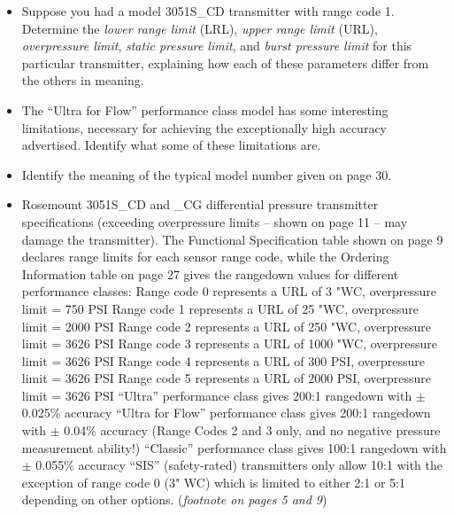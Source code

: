 \begin{itemize}
\item{} Suppose you had a model 3051S\_CD transmitter with range code 1.  Determine the {\it lower range limit} (LRL), {\it upper range limit} (URL), {\it overpressure limit}, {\it static pressure limit}, and {\it burst pressure limit} for this particular transmitter, explaining how each of these parameters differ from the others in meaning.
\item{} The ``Ultra for Flow'' performance class model has some interesting limitations, necessary for achieving the exceptionally high accuracy advertised.  Identify what some of these limitations are.
\item{} Identify the meaning of the typical model number given on page 30.
\end{itemize}














\begin{itemize}
\item{} Rosemount 3051S\_CD and \_CG differential pressure transmitter specifications (exceeding overpressure limits -- shown on page 11 -- may damage the transmitter).  The Functional Specification table shown on page 9 declares range limits for each sensor range code, while the Ordering Information table on page 27 gives the rangedown values for different performance classes:
\itemitem{} Range code 0 represents a URL of 3 "WC, overpressure limit = 750 PSI
\itemitem{} Range code 1 represents a URL of 25 "WC, overpressure limit = 2000 PSI
\itemitem{} Range code 2 represents a URL of 250 "WC, overpressure limit = 3626 PSI
\itemitem{} Range code 3 represents a URL of 1000 "WC, overpressure limit = 3626 PSI
\itemitem{} Range code 4 represents a URL of 300 PSI, overpressure limit = 3626 PSI
\itemitem{} Range code 5 represents a URL of 2000 PSI, overpressure limit = 3626 PSI
\itemitem{} ``Ultra'' performance class gives 200:1 rangedown with $\pm$ 0.025\% accuracy
\itemitem{} ``Ultra for Flow'' performance class gives 200:1 rangedown with $\pm$ 0.04\% accuracy (Range Codes 2 and 3 only, and no negative pressure measurement ability!)
\itemitem{} ``Classic'' performance class gives 100:1 rangedown with $\pm$ 0.055\% accuracy
\itemitem{} ``SIS'' (safety-rated) transmitters only allow 10:1 with the exception of range code 0 (3" WC) which is limited to either 2:1 or 5:1 depending on other options.  ({\it footnote on pages 5 and 9})
\end{itemize}

